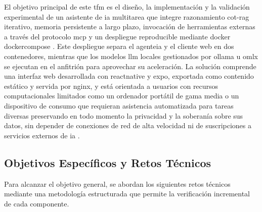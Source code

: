 El objetivo principal de este \gls{tfm} es el diseño, la implementación y la validación experimental de un asistente de \gls{ia} multitarea que integre razonamiento \gls{cot}-\gls{rag} iterativo, memoria persistente a largo plazo, invocación de herramientas externas a través del protocolo \gls{mcp} y un despliegue reproducible mediante \gls{docker} \gls{dockercompose} \cite{docker2024compose}. Este despliegue separa el \gls{agenteia} y el cliente web en dos contenedores, mientras que los modelos \gls{llm} locales gestionados por \gls{ollama} u \gls{omlx} se ejecutan en el anfitrión para aprovechar su aceleración. La solución comprende una interfaz web desarrollada con \gls{reactnative} y \gls{expo}, exportada como contenido estático y servida por \gls{nginx}, y está orientada a usuarios con recursos computacionales limitados como un ordenador portátil de gama media o un dispositivo de consumo que requieran asistencia automatizada para tareas diversas preservando en todo momento la privacidad y la soberanía sobre sus datos, sin depender de conexiones de red de alta velocidad ni de suscripciones a servicios externos de \gls{ia} \cite{nginx2026}.

\subsection{Objetivos Específicos y Retos Técnicos}
\label{subsec:objetivos-especificos}

Para alcanzar el objetivo general, se abordan los siguientes retos técnicos mediante una metodología estructurada que permite la verificación incremental de cada componente.


